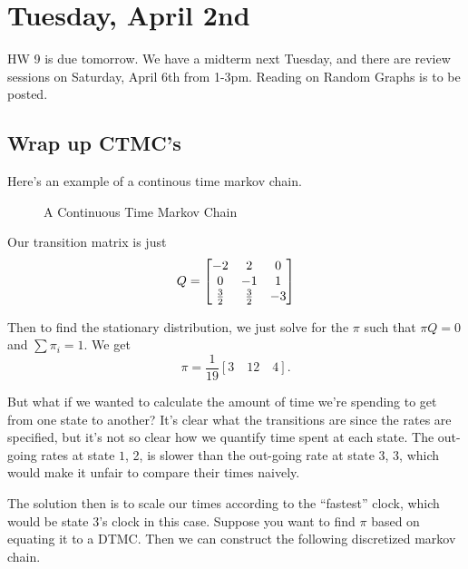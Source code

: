 \documentclass[11 pt]{scrartcl}
\begin{document}
\newpage
\section{Tuesday, April 2nd}
HW 9 is due tomorrow. We have a midterm next Tuesday, and there are review sessions on Saturday, April 6th from 1-3pm. Reading on Random Graphs is to be posted. 

\subsection{Wrap up CTMC's}
Here's an example of a continous time markov chain. 

\begin{figure}[!ht]
\begin{center}
\end{center}
\caption{A Continuous Time Markov Chain}
\end{figure}

Our transition matrix is just 
\[ Q = \begin{bmatrix} -2 & 2 & 0 \\ 0 & -1 & 1 \\ \frac{3}{2} & \frac{3}{2} & -3 \end{bmatrix}\]

Then to find the stationary distribution, we just solve for the $\pi$ such that $\pi Q = 0$ and $\sum \pi_i = 1$. We get 
\[ \pi = \dfrac{1}{19} [3\quad 12\quad 4].\] 
 
But what if we wanted to calculate the amount of time we're spending to get from one state to another? It's clear what the transitions are since the rates are specified, but it's not so clear how we quantify time spent at each state. The out-going rates at state $1$, 2, is slower than the out-going rate at state $3$, 3, which would make it unfair to compare their times naively.

The solution then is to scale our times according to the ``fastest'' clock, which would be state 3's clock in this case. Suppose you want to find $\pi$ based on equating it to a DTMC. Then we can construct the following discretized markov chain. 
\end{document}
